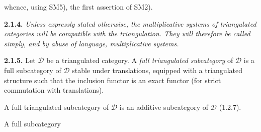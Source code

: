 \noindent whence, using SM5), the first assertion of SM2).

\medskip
\noindent\textbf{2.1.4.}\quad
{}
\emph{Unless expressly stated otherwise, the multiplicative systems of
triangulated categories will be compatible with the triangulation. They will
therefore be called simply, and by abuse of language, multiplicative systems.}

\medskip
\noindent\textbf{2.1.5.}\quad
{}
Let $\mathcal D$ be a triangulated category. A \emph{full triangulated
subcategory} of $\mathcal D$ is a full subcategory of $\mathcal D$ stable
under translations, equipped with a triangulated structure such that the
inclusion functor is an exact functor (for strict commutation with
translations).

A full triangulated subcategory of $\mathcal D$ is an additive subcategory of
$\mathcal D$ (1.2.7).

A full subcategory
\endgroup
